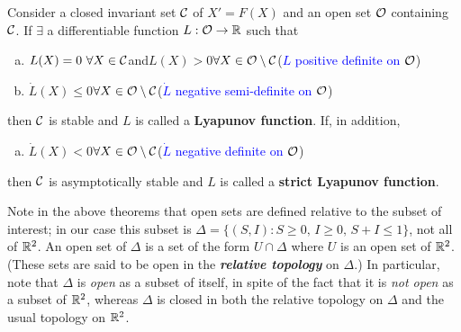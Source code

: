 {\begin{theorem}\label{Th:LyapFunGen}
Consider a closed invariant set ${\mathcal C}$ of $X'=F(X)$ and an open set ${\mathcal O}$ containing ${\mathcal C}$.   If $\exists$ a differentiable function $L:{\mathcal O}\to\mathbb{R}$ such that
  \begin{enumerate}[(a)]
  \item $L(X)=0\ \forall X\in{\mathcal C}$\quad and\quad $L(X)>0$\quad $\forall X\in{\mathcal O}\setminus{\mathcal C}$\qquad(\textcolor{blue}{$L$ positive definite on ${\mathcal O}$})
 \item $\dot{L}(X)\le0$\quad $\forall X\in{\mathcal O}\setminus{\mathcal C}$\qquad (\textcolor{blue}{$\dot L$ negative semi-definite on ${\mathcal O}$})
  \end{enumerate}
  then ${\mathcal C}$ is stable and $L$ is called a {\bfseries Lyapunov function}.  If, in addition,
  \begin{enumerate}[(c)]
  \item $\dot{L}(X)<0$\quad $\forall X\in{\mathcal O}\setminus{\mathcal C}$\qquad (\textcolor{blue}{$\dot L$ negative definite on ${\mathcal O}$})
  \end{enumerate}
then ${\mathcal C}$ is asymptotically stable and $L$ is called a {\bfseries strict Lyapunov function}.
\end{theorem}
Note in the above theorems that open sets are defined relative to the subset of interest; in our case this subset is $\Delta=\{(S,I):S\ge0,\, I\ge0,\, S+I\le1\}$, not all of $\mathbb{R}^2$.  An open set of $\Delta$ is a set of the form $U\cap\Delta$ where $U$ is an open set of $\mathbb{R}^2$.  (These sets are said to be open in the \emph{\bfseries relative topology} on $\Delta$.)  In particular, note that $\Delta$ is \emph{open} as a subset of itself, in spite of the fact that it is \emph{not open} as a subset of $\mathbb{R}^2$, whereas $\Delta$ is closed in both the relative topology on $\Delta$ and the usual topology on $\mathbb{R}^2$.
}


